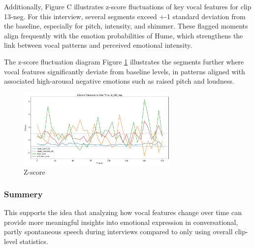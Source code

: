 Additionally, Figure C illustrates z-score fluctuations of key vocal features for clip 13-neg. For this interview, several segments exceed +-1 standard deviation from the baseline, especially for pitch, intensity, and shimmer. These flagged moments align frequently with the emotion probabilities of Hume, which strengthens the link between vocal patterns and perceived emotional intensity. 

The z-score fluctuation diagram Figure \ref{fig:z-score-15} illustrates the segments further where vocal features significantly deviate from baseline levels, in patterns aligned with associated high-arousal negative emotions such as raised pitch and loudness. 

\begin{figure}[H]
    \centering 
    \includegraphics[width=0.7\textwidth]{png/results/rq1/zscore_fluctuations_id_015_neg.pdf}
    \caption{Z-score}
    \label{fig:z-score-15}
\end{figure}

\subsubsection{Summery}
This supports the idea that analyzing how vocal features change over time  can provide more meaningful insights into emotional expression in conversational, partly spontaneous speech during interviews compared to only using overall clip-level statistics.